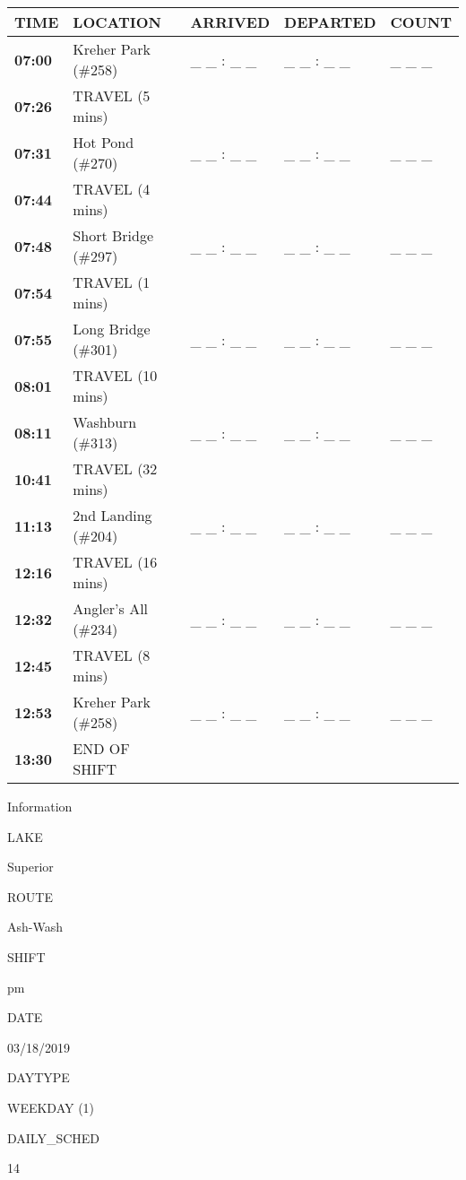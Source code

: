 \documentclass[]{article}
\begin{document}
\begin{tabular}{>{\bfseries}lllll}
\toprule
\textbf{TIME} & \textbf{LOCATION} & \textbf{ARRIVED} & \textbf{DEPARTED} & \textbf{COUNT}\\
\midrule
07:00 & Kreher Park (\#258) & \_ \_ : \_ \_ & \_ \_ : \_ \_ & \_ \_ \_\\
07:26 & TRAVEL (5 mins) &  &  & \\
07:31 & Hot Pond (\#270) & \_ \_ : \_ \_ & \_ \_ : \_ \_ & \_ \_ \_\\
07:44 & TRAVEL (4 mins) &  &  & \\
07:48 & Short Bridge (\#297) & \_ \_ : \_ \_ & \_ \_ : \_ \_ & \_ \_ \_\\
07:54 & TRAVEL (1 mins) &  &  & \\
07:55 & Long Bridge (\#301) & \_ \_ : \_ \_ & \_ \_ : \_ \_ & \_ \_ \_\\
08:01 & TRAVEL (10 mins) &  &  & \\
08:11 & Washburn (\#313) & \_ \_ : \_ \_ & \_ \_ : \_ \_ & \_ \_ \_\\
10:41 & TRAVEL (32 mins) &  &  & \\
11:13 & 2nd Landing (\#204) & \_ \_ : \_ \_ & \_ \_ : \_ \_ & \_ \_ \_\\
12:16 & TRAVEL (16 mins) &  &  & \\
12:32 & Angler's All (\#234) & \_ \_ : \_ \_ & \_ \_ : \_ \_ & \_ \_ \_\\
12:45 & TRAVEL (8 mins) &  &  & \\
12:53 & Kreher Park (\#258) & \_ \_ : \_ \_ & \_ \_ : \_ \_ & \_ \_ \_\\
13:30 & END OF SHIFT &  &  & \\
\bottomrule
\end{tabular}\newpage

Information

LAKE

Superior

ROUTE

Ash-Wash

SHIFT

pm

DATE

03/18/2019

DAYTYPE

WEEKDAY (1)

DAILY\_SCHED

14

\vspace{24pt}
\end{document}
